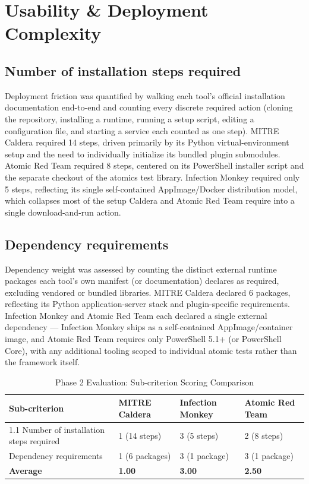 
\section{Usability \& Deployment Complexity}\label{sec:Matrix1}
\subsection{Number of installation steps required}\label{sec:Matrix1_1_1}

Deployment friction was quantified by walking each tool's official installation documentation end-to-end and counting every discrete required action (cloning the repository, installing a runtime, running a setup script, editing a configuration file, and starting a service each counted as one step). MITRE Caldera required 14 steps, driven primarily by its Python virtual-environment setup and the need to individually initialize its bundled plugin submodules. Atomic Red Team required 8 steps, centered on its PowerShell installer script and the separate checkout of the atomics test library. Infection Monkey required only 5 steps, reflecting its single self-contained AppImage/Docker distribution model, which collapses most of the setup Caldera and Atomic Red Team require into a single download-and-run action.

\subsection{Dependency requirements}\label{sec:Matrix1_1_2}

Dependency weight was assessed by counting the distinct external runtime packages each tool's own manifest (or documentation) declares as required, excluding vendored or bundled libraries. MITRE Caldera declared 6 packages, reflecting its Python application-server stack and plugin-specific requirements. Infection Monkey and Atomic Red Team each declared a single external dependency --- Infection Monkey ships as a self-contained AppImage/container image, and Atomic Red Team requires only PowerShell 5.1+ (or PowerShell Core), with any additional tooling scoped to individual atomic tests rather than the framework itself.

\begin{table}
    \centering
    \caption{Phase 2 Evaluation: Sub-criterion Scoring Comparison}
    \small
    \begin{tabularx}{\textwidth}{lXXX}
        \toprule
        \textbf{Sub-criterion} & \textbf{MITRE Caldera} & \textbf{Infection Monkey} & \textbf{Atomic Red Team} \\
        \midrule
        1.1 Number of installation steps required & 1 (14 steps) & 3 (5 steps) & 2 (8 steps) \\
        \addlinespace
        1.2 Dependency requirements & 1 (6 packages) & 3 (1 package) & 3 (1 package) \\
        \midrule
        \textbf{Average} & \textbf{1.00} & \textbf{3.00} & \textbf{2.50} \\
        \bottomrule
    \end{tabularx}
\end{table}

